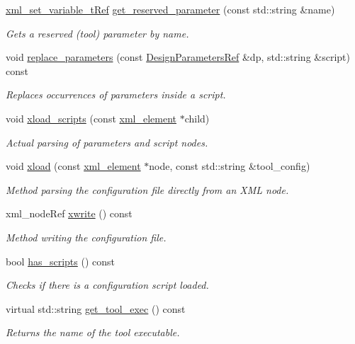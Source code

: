 \begin{DoxyCompactItemize}
\hyperlink{xml__script__command_8hpp_a77453d591123aae088dbc1d0efe15f00}{xml\+\_\+set\+\_\+variable\+\_\+t\+Ref} \hyperlink{classSynthesisTool_abcbbbb7757278ee775afff2e7b7459c3}{get\+\_\+reserved\+\_\+parameter} (const std\+::string \&name)
\begin{DoxyCompactList}\small\item\em Gets a reserved (tool) parameter by name. \end{DoxyCompactList}\item 
void \hyperlink{classSynthesisTool_a96fbad52c8ebfe4b2685c2f47d824fa2}{replace\+\_\+parameters} (const \hyperlink{DesignParameters_8hpp_ae36bb1c4c9150d0eeecfe1f96f42d157}{Design\+Parameters\+Ref} \&dp, std\+::string \&script) const
\begin{DoxyCompactList}\small\item\em Replaces occurrences of parameters inside a script. \end{DoxyCompactList}\item 
void \hyperlink{classSynthesisTool_a4ab567e999004b7d1c798115f548eb46}{xload\+\_\+scripts} (const \hyperlink{classxml__element}{xml\+\_\+element} $\ast$child)
\begin{DoxyCompactList}\small\item\em Actual parsing of parameters and script nodes. \end{DoxyCompactList}\item 
void \hyperlink{classSynthesisTool_a7f73cdb803166570cad3f9959188cf4f}{xload} (const \hyperlink{classxml__element}{xml\+\_\+element} $\ast$node, const std\+::string \&tool\+\_\+config)
\begin{DoxyCompactList}\small\item\em Method parsing the configuration file directly from an X\+ML node. \end{DoxyCompactList}\item 
xml\+\_\+node\+Ref \hyperlink{classSynthesisTool_afd06f53f3a3273de98fe02143b123252}{xwrite} () const
\begin{DoxyCompactList}\small\item\em Method writing the configuration file. \end{DoxyCompactList}\item 
bool \hyperlink{classSynthesisTool_a3a0d25063c6aa0ddb5febc1babe896ac}{has\+\_\+scripts} () const
\begin{DoxyCompactList}\small\item\em Checks if there is a configuration script loaded. \end{DoxyCompactList}\item 
virtual std\+::string \hyperlink{classSynthesisTool_abe3aeea1f961e93d41dbbcda0b8d6414}{get\+\_\+tool\+\_\+exec} () const
\begin{DoxyCompactList}\small\item\em Returns the name of the tool executable. \end{DoxyCompactList}\end{DoxyCompactItemize}
